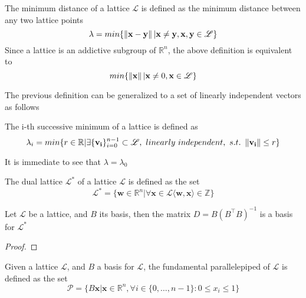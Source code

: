 \begin{definition}
The minimum distance of a lattice $\mathscr{L}$ is defined as the minimum distance between any two lattice points
\begin{equation*}
\lambda = min\{\left\lVert \mathbf{x}-\mathbf{y} \right\rVert|\mathbf{x}\ne \mathbf{y}, \mathbf{x},\mathbf{y}\in\mathscr{L}\}
\end{equation*}
Since a lattice is an addictive subgroup of $\mathbb{R}^n$, the above definition is equivalent to
\begin{equation*}
min\{\left\lVert \mathbf{x} \right\rVert|\mathbf{x}\ne0, \mathbf{x}\in\mathscr{L}\}
\end{equation*}
\end{definition}

The previous definition can be generalized to a set of linearly independent vectors as follows
\begin{definition}
The i-th successive minimum of a lattice is defined as 
\begin{equation*}
\lambda_i = min\{r \in \mathbb{R}|\exists \{\mathbf{v_i}\}_{i=0}^{n-1} \subset \mathscr{L},\text{ }linearly\text{ }independent,\text{ }s.t.\text{ }\left\lVert \mathbf{v_i} \right\rVert\leq r\}
\end{equation*}
\end{definition}

\begin{remark}
It is immediate to see that $\lambda=\lambda_0$
\end{remark}

\begin{definition}
The dual lattice $\mathscr{L}^*$ of a lattice $\mathscr{L}$ is defined as the set
\begin{equation*}
\mathscr{L}^*=\{\mathbf{w}\in\mathbb{R}^n|\forall\mathbf{x}\in\mathscr{L}\langle\mathbf{w},\mathbf{x}\rangle\in\mathbb{Z}\}
\end{equation*}
\end{definition} 

\begin{theorem}
Let $\mathscr{L}$ be a lattice, and $B$ its basis, then the matrix $D=B(B^{\top}B)^{-1}$ is a basis for $\mathscr{L}^*$
\end{theorem}
\begin{proof}
\end{proof}

\begin{definition}
Given a lattice $\mathscr{L}$, and $B$ a basis for $\mathscr{L}$, the fundamental parallelepiped of $\mathscr{L}$ is defined as the set
\begin{equation*}
\mathscr{P} = \{B\mathbf{x}|\mathbf{x}\in\mathbb{R}^n, \forall i \in \{0,\ldots,n-1\}:0\leq x_i \leq 1 \}
\end{equation*}
\end{definition}

